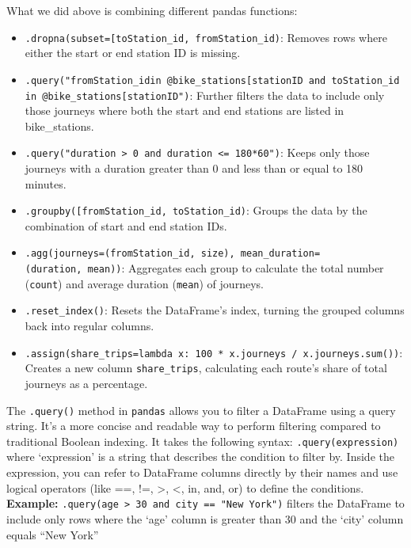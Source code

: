 \documentclass[
  letterpaper,
  DIV=11,
  numbers=noendperiod]{scrreprt}
\providecommand{\tightlist}{%
  \setlength{\itemsep}{0pt}\setlength{\parskip}{0pt}}\usepackage{longtable,booktabs,array}
\begin{document}
What we did above is combining different pandas functions:

\begin{itemize}
\tightlist
\item
  \texttt{.dropna(subset={[}\textquotesingle{}toStation\_id\textquotesingle{},\ \textquotesingle{}fromStation\_id\textquotesingle{}{]})}:
  Removes rows where either the start or end station ID is missing.
\item
  \texttt{.query("fromStation\_idin\ @bike\_stations{[}\textquotesingle{}stationID\textquotesingle{}{]}\ and\ toStation\_id\ in\ @bike\_stations{[}\textquotesingle{}stationID\textquotesingle{}{]}")}:
  Further filters the data to include only those journeys where both the
  start and end stations are listed in bike\_stations.
\item
  \texttt{.query("duration\ \textgreater{}\ 0\ and\ duration\ \textless{}=\ 180*60")}:
  Keeps only those journeys with a duration greater than 0 and less than
  or equal to 180 minutes.
\item
  \texttt{.groupby({[}\textquotesingle{}fromStation\_id\textquotesingle{},\ \textquotesingle{}toStation\_id\textquotesingle{}{]})}:
  Groups the data by the combination of start and end station IDs.
\item
  \texttt{.agg(journeys=(\textquotesingle{}fromStation\_id\textquotesingle{},\ \textquotesingle{}size\textquotesingle{}),\ mean\_duration=(\textquotesingle{}duration\textquotesingle{},\ \textquotesingle{}mean\textquotesingle{}))}:
  Aggregates each group to calculate the total number (\texttt{count})
  and average duration (\texttt{mean}) of journeys.
\item
  \texttt{.reset\_index()}: Resets the DataFrame's index, turning the
  grouped columns back into regular columns.
\item
  \texttt{.assign(share\_trips=lambda\ x:\ 100\ *\ x.journeys\ /\ x.journeys.sum())}:
  Creates a new column \texttt{share\_trips}, calculating each route's
  share of total journeys as a percentage.
\end{itemize}

The \texttt{.query()} method in \texttt{pandas} allows you to filter a
DataFrame using a query string. It's a more concise and readable way to
perform filtering compared to traditional Boolean indexing. It takes the
following syntax:
\texttt{.query(\textquotesingle{}expression\textquotesingle{})} where
`expression' is a string that describes the condition to filter by.
Inside the expression, you can refer to DataFrame columns directly by
their names and use logical operators (like ==, !=, \textgreater,
\textless, in, and, or) to define the conditions. \textbf{Example:}
\texttt{.query(\textquotesingle{}age\ \textgreater{}\ 30\ and\ city\ ==\ "New\ York"\textquotesingle{})}
filters the DataFrame to include only rows where the `age' column is
greater than 30 and the `city' column equals ``New York''
\end{document}

